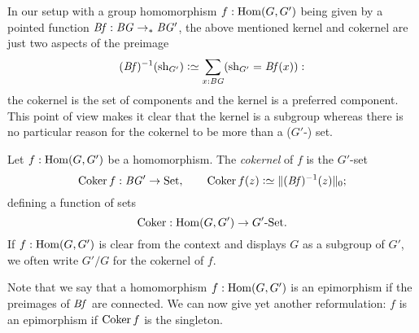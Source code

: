 In our setup with a group homomorphism 
$f:\Hom(G,G')$ being given by a pointed function $\mathit{B}\mathit{f}:\mathit{B}\mathit{G}\to_*\mathit{B}\mathit{G}'$, the above mentioned kernel and cokernel are just two aspects of the preimage 
$$(\Bf)^{-1}(\sh_{G'})\defequi\sum_{x:\BG}(\sh_{G'}=\Bf(x)):$$
the cokernel is the set of components and the kernel is a preferred component.  This point of view makes it clear that the kernel is a subgroup whereas there is no particular reason for the cokernel to be more than a ($G'$-) set.
\begin{definition}
  \label{def:cokernel}
  Let $f:\Hom(G,G')$  be a homomorphism.
The \emph{cokernel} of $f$ is the $G'$-set
\[
  \coker f:\BG'\to\Set,\qquad \coker f(z)\defequi  \Trunc{(\Bf)^{-1}(z)}_0;
\]
defining a function of sets
$$\coker:\Hom(G,G')\to G'\text{-}\Set.$$
If $f:\Hom(G,G')$ is clear from the context and displays $G$ as a subgroup of $G'$, we often write $G'/G$ for the cokernel of $f$. 
\end{definition}
\begin{remark}
  Note that we say that a homomorphism $f:\Hom(G,G')$ is an epimorphism if the preimages of $\mathit{B}\mathit{f}$ are connected.  We can now give yet another reformulation: $f$ is an epimorphism if $\coker f$ is the singleton.
\end{remark}


